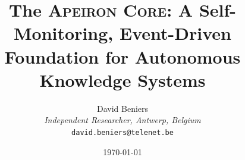 \documentclass[11pt,a4paper]{article}
\title{\huge The \textsc{Apeiron Core}: A Self-Monitoring, Event-Driven Foundation for Autonomous Knowledge Systems}
\author{
    David Beniers \\
    \small \textit{Independent Researcher, Antwerp, Belgium} \\
    \small \texttt{david.beniers@telenet.be}
}
\date{\today}
\begin{document}
\maketitle


\tableofcontents
\clearpage


\FloatBarrier
\clearpage

\FloatBarrier
\clearpage

\FloatBarrier
\clearpage

\FloatBarrier
\clearpage

\FloatBarrier
\clearpage

\FloatBarrier
\clearpage

\FloatBarrier
\clearpage

\FloatBarrier
\clearpage

\FloatBarrier
\clearpage

\FloatBarrier
\clearpage
\printbibliography
\end{document}
